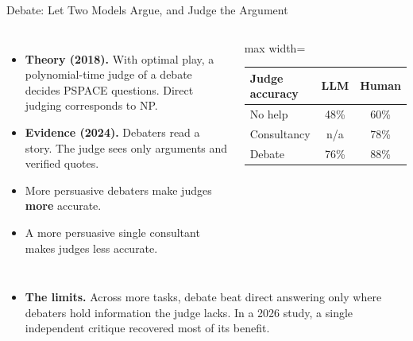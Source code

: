 \begin{frame}{Debate: Let Two Models Argue, and Judge the Argument}
    \begin{columns}[T,onlytextwidth]
        \begin{itemize}\itemsep0.4em
            \item \textbf{Theory (2018).} With optimal play, a polynomial-time judge of a debate decides PSPACE questions. Direct judging corresponds to NP.
            \item \textbf{Evidence (2024).} Debaters read a story. The judge sees only arguments and verified quotes.
            \item More persuasive debaters make judges \textbf{more} accurate.
            \item A more persuasive single consultant makes judges \alert{less} accurate.
        \end{itemize}
        \centering
        \small
        \begin{adjustbox}{max width=\linewidth}\begin{tabular}{lcc}
            \toprule
            \textbf{Judge accuracy} & \textbf{LLM} & \textbf{Human} \\
            \midrule
            No help & 48\% & 60\% \\
            Consultancy & n/a & 78\% \\
            \rowcolor{KAUSTcyan!12} Debate & 76\% & 88\% \\
            \bottomrule
        \end{tabular}\end{adjustbox}
    \end{columns}
    \vspace{0.5em}
    \begin{itemize}\itemsep0.4em
        \item \textbf{The limits.} Across more tasks, debate beat direct answering only where debaters hold information the judge lacks. In a 2026 study, a single independent critique recovered most of its benefit.
    \end{itemize}
\end{frame}

